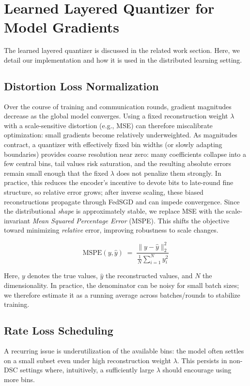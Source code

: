 \section{Learned Layered Quantizer for Model Gradients}

The learned layered quantizer is discussed in the related work section. Here, we detail our implementation and how it is used in the distributed learning setting.

\subsection{Distortion Loss Normalization}
Over the course of training and communication rounds, gradient magnitudes decrease as the global model converges. Using a fixed reconstruction weight $\lambda$ with a scale-sensitive distortion (e.g., MSE) can therefore miscalibrate optimization: small gradients become relatively underweighted. As magnitudes contract, a quantizer with effectively fixed bin widths (or slowly adapting boundaries) provides coarse resolution near zero: many coefficients collapse into a few central bins, tail values risk saturation, and the resulting absolute errors remain small enough that the fixed $\lambda$ does not penalize them strongly. In practice, this reduces the encoder's incentive to devote bits to late-round fine structure, so relative error grows; after inverse scaling, these biased reconstructions propagate through FedSGD and can impede convergence. Since the distributional \emph{shape} is approximately stable, we replace MSE with the scale-invariant \emph{Mean Squared Percentage Error} (MSPE). This shifts the objective toward minimizing \emph{relative} error, improving robustness to scale changes.

\begin{equation}
    \mathrm{MSPE}(y,\hat{y}) \;=\; \frac{\|y - \hat{y}\|_2^2}{\frac{1}{N}\sum_{i=1}^N y_i^2}
\end{equation}

Here, $y$ denotes the true values, $\hat{y}$ the reconstructed values, and $N$ the dimensionality. In practice, the denominator can be noisy for small batch sizes; we therefore estimate it as a running average across batches/rounds to stabilize training.

\subsection{Rate Loss Scheduling}
A recurring issue is underutilization of the available bins: the model often settles on a small subset even under high reconstruction weight $\lambda$. This persists in non-DSC settings where, intuitively, a sufficiently large $\lambda$ should encourage using more bins.

